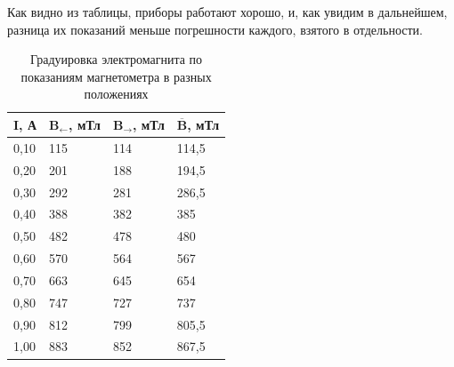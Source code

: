 \documentclass[a4paper, 12pt]{article}
\begin{document}
{Как видно из таблицы, приборы работают хорошо, и, как увидим в дальнейшем, разница их показаний меньше погрешности каждого, взятого в отдельности.

\begin{table}[H]
\centering
\begin{tabular}{|l|l|l|l|}
\hline
\textbf{$\mathbf{I}$, А} & \textbf{$\mathbf{B_\leftarrow}$, мТл} & \textbf{$\mathbf{B_\rightarrow}$, мТл} & \textbf{$\mathbf{\overline B}$, мТл} \\ \hline
0,10                     & 115                                   & 114                                    & 114,5                                \\ \hline
0,20                     & 201                                   & 188                                    & 194,5                                \\ \hline
0,30                     & 292                                   & 281                                    & 286,5                                \\ \hline
0,40                     & 388                                   & 382                                    & 385                                  \\ \hline
0,50                     & 482                                   & 478                                    & 480                                  \\ \hline
0,60                     & 570                                   & 564                                    & 567                                  \\ \hline
0,70                     & 663                                   & 645                                    & 654                                  \\ \hline
0,80                     & 747                                   & 727                                    & 737                                  \\ \hline
0,90                     & 812                                   & 799                                    & 805,5                                \\ \hline
1,00                     & 883                                   & 852                                    & 867,5                                \\ \hline
\end{tabular}
\caption{Градуировка электромагнита по показаниям магнетометра в разных положениях}
\end{table}


}
\end{document}
